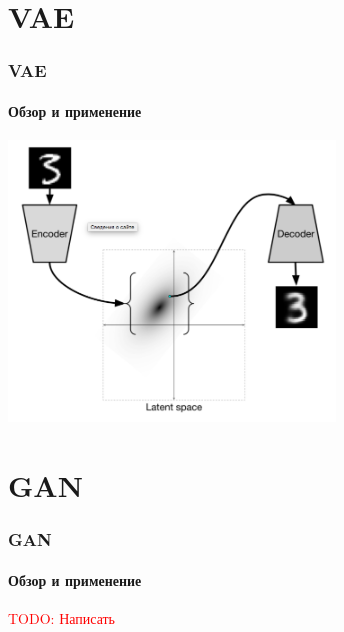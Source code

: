 \documentclass[10pt]{beamer}
\newcommand\TODO[1]{\textcolor{red}{{\Large TODO: #1}}}
\begin{document}
\section{VAE}
\begin{frame}
\frametitle{VAE}
\framesubtitle{Обзор и применение}

\begin{center}
    \includegraphics[width=0.65\textwidth]{images/vae.png}
\end{center}

\end{frame}
\section{GAN}
\begin{frame}
\frametitle{GAN}
\framesubtitle{Обзор и применение}

\TODO{Написать}

\end{frame}
\end{document}
